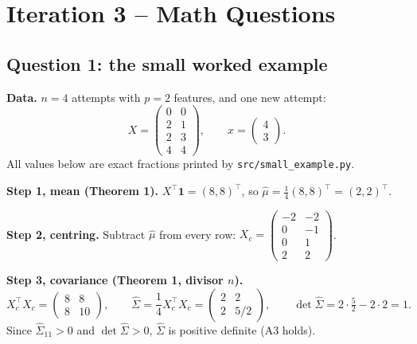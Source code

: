 \documentclass[11pt]{article}
\newcommand{\one}{\mathbf{1}}
\newcommand{\T}{^{\top}}
\newcommand{\hSigma}{\hat{\Sigma}}
\newcommand{\hmu}{\hat{\mu}}
\newcommand{\code}[1]{\texttt{#1}}
\theoremstyle{plain}
\begin{document}
\section{Iteration 3 -- Math Questions}\label{sec:questions}

\subsection{Question 1: the small worked example}
\textbf{Data.} $n=4$ attempts with $p=2$ features, and one new attempt:
\[
X=\begin{pmatrix}0&0\\2&1\\2&3\\4&4\end{pmatrix},\qquad x=\begin{pmatrix}4\\3\end{pmatrix}.
\]
All values below are exact fractions printed by \code{src/small\_example.py}.

\textbf{Step 1, mean (Theorem 1).} $X\T\one=(8,8)\T$, so $\hmu=\frac14(8,8)\T=(2,2)\T$.

\textbf{Step 2, centring.} Subtract $\hmu$ from every row:
$X_c=\begin{pmatrix}-2&-2\\0&-1\\0&1\\2&2\end{pmatrix}$.

\textbf{Step 3, covariance (Theorem 1, divisor $n$).}
\[
X_c\T X_c=\begin{pmatrix}8&8\\8&10\end{pmatrix},\qquad
\hSigma=\frac14X_c\T X_c=\begin{pmatrix}2&2\\2&5/2\end{pmatrix},\qquad
\det\hSigma=2\cdot\tfrac52-2\cdot2=1.
\]
Since $\hSigma_{11}>0$ and $\det\hSigma>0$, $\hSigma$ is positive definite (A3 holds).
\end{document}
